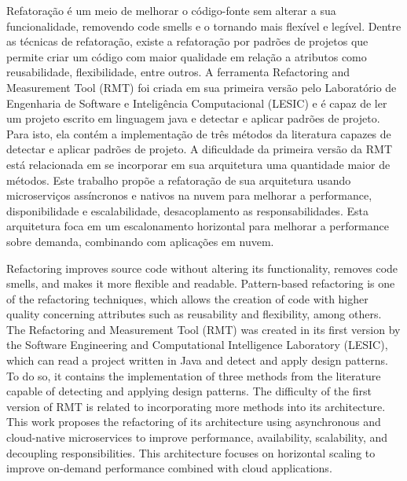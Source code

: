 \begin{Abstract}[brazilian]%
Refatoração é um meio de melhorar o código-fonte sem alterar a sua funcionalidade, removendo code smells e o tornando mais flexível e legível. Dentre as técnicas de refatoração, existe a refatoração por padrões de projetos que permite criar um código com maior qualidade em relação a atributos como reusabilidade, flexibilidade, entre outros. A ferramenta Refactoring and Measurement Tool (RMT) foi criada em sua primeira versão pelo Laboratório de Engenharia de Software e Inteligência Computacional (LESIC) e é capaz de ler um projeto escrito em linguagem java e detectar e aplicar padrões de projeto. Para isto, ela contém a implementação de três métodos da literatura capazes de detectar e aplicar padrões de projeto. A dificuldade da primeira versão da RMT está relacionada em se incorporar em sua arquitetura uma quantidade maior de métodos. Este trabalho propõe a refatoração de sua arquitetura usando microserviços assíncronos e nativos na nuvem para melhorar a performance, disponibilidade e escalabilidade, desacoplamento as responsabilidades. Esta arquitetura foca em um escalonamento horizontal para melhorar a performance sobre demanda, combinando com aplicações em nuvem.
\end{Abstract}
\begin{Abstract}[english]%
Refactoring improves source code without altering its functionality, removes code smells, and makes it more flexible and readable. Pattern-based refactoring is one of the refactoring techniques, which allows the creation of code with higher quality concerning attributes such as reusability and flexibility, among others. The Refactoring and Measurement Tool (RMT) was created in its first version by the Software Engineering and Computational Intelligence Laboratory (LESIC), which can read a project written in Java and detect and apply design patterns. To do so, it contains the implementation of three methods from the literature capable of detecting and applying design patterns. The difficulty of the first version of RMT is related to incorporating more methods into its architecture. This work proposes the refactoring of its architecture using asynchronous and cloud-native microservices to improve performance, availability, scalability, and decoupling responsibilities. This architecture focuses on horizontal scaling to improve on-demand performance combined with cloud applications.
\end{Abstract}
